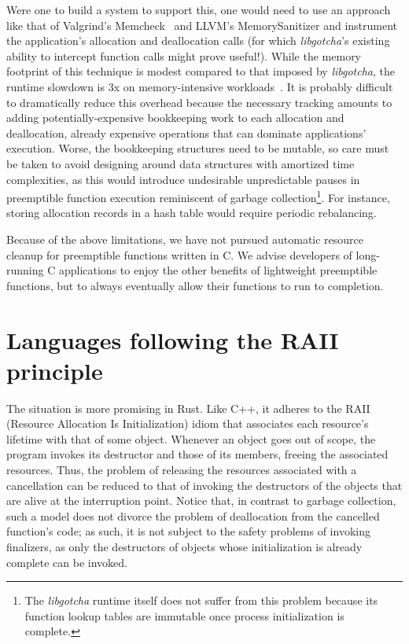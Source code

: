Were one to build a system to support this, one would need to use an approach like
that of Valgrind's Memcheck~\cite{seward:usenix2005} and LLVM's MemorySanitizer and
instrument the application's allocation and deallocation calls (for which
\textit{libgotcha}'s existing ability to intercept function calls might prove
useful!).  While the memory footprint of this technique is modest compared to that
imposed by \textit{libgotcha}, the runtime slowdown is 3x on memory-intensive
workloads~\cite{stepanov:cgo2015}.  It is probably difficult to dramatically reduce
this overhead because the necessary tracking amounts to adding potentially-expensive
bookkeeping work to each allocation and deallocation, already expensive operations
that can dominate applications' execution.  Worse, the bookkeeping structures need to
be mutable, so care must be taken to avoid designing around data structures with
amortized time complexities, as this would introduce undesirable unpredictable pauses
in preemptible function execution reminiscent of garbage collection\footnote{The
\textit{libgotcha} runtime itself does not suffer from this problem because its
function lookup tables are immutable once process initialization is complete.}.  For
instance, storing allocation records in a hash table would require periodic
rebalancing.

Because of the above limitations, we have not pursued automatic resource cleanup for
preemptible functions written in C.  We advise developers of long-running C
applications to enjoy the other benefits of lightweight preemptible functions, but to
always eventually allow their functions to run to completion.


\section{Languages following the RAII principle}

The situation is more promising in Rust.  Like C++, it adheres to the RAII (Resource
Allocation Is Initialization) idiom that associates each resource's lifetime with
that of some object.  Whenever an object goes out of scope, the program invokes its
destructor and those of its members, freeing the associated resources.  Thus, the
problem of releasing the resources associated with a cancellation can be reduced to
that of invoking the destructors of the objects that are alive at the interruption
point.  Notice that, in contrast to garbage collection, such a model does not divorce
the problem of deallocation from the cancelled function's code; as such, it is not
subject to the safety problems of invoking finalizers, as only the destructors of
objects whose initialization is already complete can be invoked.

